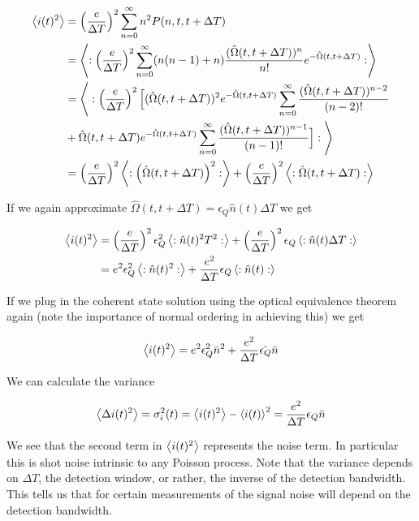 \documentclass[12pt]{article}
\newcommand{\ep}{\epsilon}
\begin{document}
\begin{align}
\Braket{i(t)^2} &= \left(\frac{e}{\Delta T}\right)^2 \sum_{n=0}^{\infty} n^2 P(n,t,t+\Delta T)\\
&=\Braket{:\left(\frac{e}{\Delta T}\right)^2 \sum_{n=0}^{\infty} (n(n-1) + n) \frac{(\hat{\Omega}(t,t+\Delta T))^n}{n!} e^{-\hat{\Omega}(t,t+\Delta T)}:}\\
&= \Bigg \langle:\left(\frac{e}{\Delta T}\right)^2 \Big[(\hat{\Omega}(t,t+\Delta T))^2 e^{-\hat{\Omega}(t,t+\Delta T)} \sum_{n=0}^{\infty} \frac{(\hat{\Omega}(t,t+\Delta T))^{n-2}}{(n-2)!}\\
& + \hat{\Omega}(t,t+\Delta T) e^{-\hat{\Omega}(t,t+\Delta T)} \sum_{n=0}^{\infty} \frac{(\hat{\Omega}(t,t+\Delta T))^{n-1}}{(n-1)!}\Big]: \Bigg \rangle\\
&= \left(\frac{e}{\Delta T}\right)^2 \Braket{:\left(\hat{\Omega}(t,t+\Delta T)\right)^2:} + \left(\frac{e}{\Delta T}\right)^2 \Braket{:\hat{\Omega}(t,t+\Delta T):}
\end{align}

If we again approximate $\hat{\Omega}(t,t+\Delta T) = \ep_Q \hat{n}(t) \Delta T$ we get

\begin{align}
\Braket{i(t)^2} &= \left( \frac{e}{\Delta T} \right)^2 \ep_Q^2 \Braket{:\hat{n}(t)^2 T^2 :} + \left(\frac{e}{\Delta T}\right)^2 \ep_Q \Braket{:\hat{n}(t) \Delta T :}\\
&= e^2 \ep_Q^2 \Braket{:\hat{n}(t)^2:} + \frac{e^2}{\Delta T} \ep_Q\Braket{:\hat{n}(t):}
\end{align}

If we plug in the coherent state solution using the optical equivalence theorem again (note the importance of normal ordering in achieving this) we get

\begin{align}
\Braket{i(t)^2} = e^2 \ep_Q^2 \bar{n}^2 + \frac{e^2}{\Delta T} \hat{\ep_Q} \bar{n}
\end{align}

We can calculate the variance

\begin{align}
\Braket{\Delta i(t)^2} = \sigma_i^2(t) = \Braket{i(t)^2} - \Braket{i(t)}^2 = \frac{e^2}{\Delta T} \ep_Q \bar{n}
\end{align}

We see that the second term in $\Braket{i(t)^2}$ represents the noise term. In particular this is shot noise intrinsic to any Poisson process. Note that the variance depends on $\Delta T$, the detection window, or rather, the inverse of the detection bandwidth. This tells us that for certain measurements of the signal noise will depend on the detection bandwidth.
\end{document}

